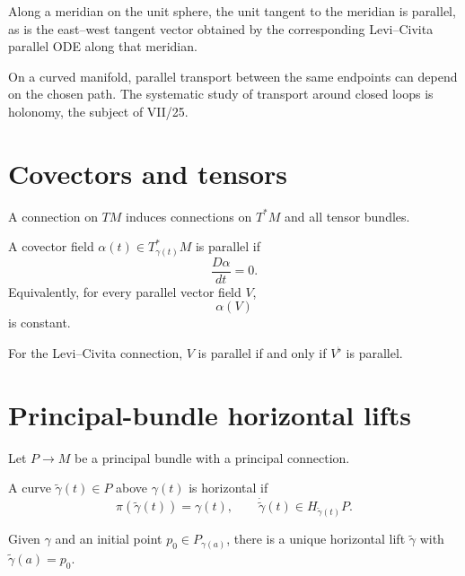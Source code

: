 \begin{example}[Meridian]\label{ex:vii24-meridian}
Along a meridian on the unit sphere, the unit tangent to the meridian is parallel,
as is the east--west tangent vector obtained by the corresponding Levi--Civita
parallel ODE along that meridian.
\end{example}

\begin{warning}\label{warn:vii24-path}
On a curved manifold, parallel transport between the same endpoints can depend on
the chosen path.  The systematic study of transport around closed loops is
holonomy, the subject of VII/25.
\end{warning}

\section{Covectors and tensors}

A connection on \(TM\) induces connections on \(T^*M\) and all tensor bundles.

\begin{definition}\label{def:vii24-covector}
A covector field \(\alpha(t)\in T^*_{\gamma(t)}M\) is parallel if
\[
\frac{D\alpha}{dt}=0.
\]
Equivalently, for every parallel vector field \(V\),
\[
\alpha(V)
\]
is constant.
\end{definition}

\begin{proposition}\label{prop:vii24-musical}
For the Levi--Civita connection, \(V\) is parallel if and only if \(V^\flat\) is
parallel.
\end{proposition}

\section{Principal-bundle horizontal lifts}

Let \(P\to M\) be a principal bundle with a principal connection.

\begin{definition}\label{def:vii24-horizontal-lift}
A curve \(\widetilde\gamma(t)\in P\) above \(\gamma(t)\) is horizontal if
\[
\pi(\widetilde\gamma(t))=\gamma(t),
\qquad
\dot{\widetilde\gamma}(t)\in H_{\widetilde\gamma(t)}P.
\]
\end{definition}

\begin{theorem}\label{thm:vii24-horizontal-lift}
Given \(\gamma\) and an initial point \(p_0\in P_{\gamma(a)}\), there is a unique
horizontal lift \(\widetilde\gamma\) with
\(\widetilde\gamma(a)=p_0\).
\end{theorem}

